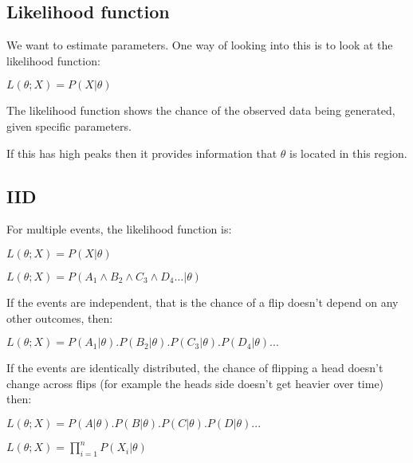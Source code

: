 
\subsection{Likelihood function}

We want to estimate parameters. One way of looking into this is to look at the likelihood function:

\(L(\theta ; X)=P(X|\theta )\)

The likelihood function shows the chance of the observed data being generated, given specific parameters.

If this has high peaks then it provides information that \(\theta \) is located in this region.

\subsection{IID}

For multiple events, the likelihood function is:

\(L(\theta ; X)=P(X|\theta )\)

\(L(\theta ; X)=P(A_1 \land B_2 \land C_3 \land D_4…|\theta )\)

If the events are independent, that is the chance of a flip doesn’t depend on any other outcomes, then:

\(L(\theta ; X)=P(A_1|\theta ).P(B_2|\theta ).P(C_3|\theta ).P(D_4|\theta )...\)

If the events are identically distributed, the chance of flipping a head doesn’t change across flips (for example the heads side doesn’t get heavier over time) then:

\(L(\theta ; X)=P(A|\theta ).P(B|\theta ).P(C|\theta ).P(D|\theta )...\)

\(L(\theta ; X)=\prod_{i=1}^n P(X_i|\theta )\)

